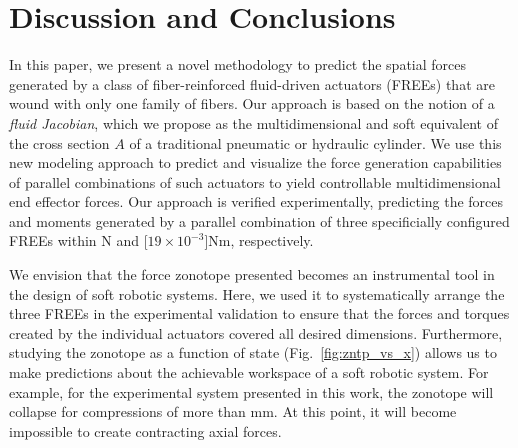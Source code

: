 \section{Discussion and Conclusions}
\label{sec:conclusion}
In this paper, we present a novel methodology to predict the spatial forces generated by a class of fiber-reinforced fluid-driven actuators (FREEs) that are wound with only one family of fibers.
Our approach is based on the notion of a \emph{fluid Jacobian}, which we propose as the multidimensional and soft equivalent of the cross section $A$ of a traditional pneumatic or hydraulic cylinder.
We use this new modeling approach to predict and visualize the force generation capabilities of parallel combinations of such actuators to yield controllable multidimensional end effector forces.
Our approach is verified experimentally, predicting the forces and moments generated by a parallel combination of three specificially configured FREEs within \unit[3]{N} and \unit[$19 \times 10^{-3}$]{Nm}, respectively.

We envision that the force zonotope presented becomes an instrumental tool in the design of soft robotic systems.
Here, we used it to systematically arrange the three FREEs in the experimental validation to ensure that the forces and torques created by the individual actuators covered all desired dimensions.
Furthermore, studying the zonotope as a function of state (Fig.~\ref{fig:zntp_vs_x}) allows us to make predictions about the achievable workspace of a soft robotic system.
For example, for the experimental system presented in this work, the zonotope will collapse for compressions of more than \unit[-10]{mm}.
At this point, it will become impossible to create contracting axial forces.

